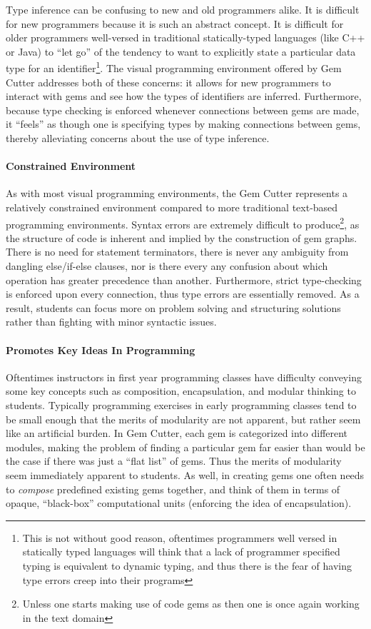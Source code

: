Type inference can be confusing to new and old programmers alike.  It is difficult for new programmers because it is such an abstract concept.  It is difficult for older programmers well-versed in traditional statically-typed languages (like C++ or Java) to ``let go'' of the tendency to want to explicitly state a particular data type for an identifier\footnote{This is not without good reason, oftentimes programmers well versed in statically typed languages will think that a lack of programmer specified typing is equivalent to dynamic typing, and thus there is the fear of having type errors creep into their programs}.  The visual programming environment offered by Gem Cutter addresses both of these concerns: it allows for new programmers to interact with gems and see how the types of identifiers are inferred.  Furthermore, because type checking is enforced whenever connections between gems are made, it ``feels'' as though one is specifying types by making connections between gems, thereby alleviating concerns about the use of type inference.

\paragraph{Constrained Environment}

As with most visual programming environments, the Gem Cutter represents a relatively constrained environment compared to more traditional text-based programming environments.  Syntax errors are extremely difficult to produce\footnote{Unless one starts making use of code gems as then one is once again working in the text domain}, as the structure of code is inherent and implied by the construction of gem graphs.  There is no need for statement terminators, there is never any ambiguity from dangling else/if-else clauses, nor is there every any confusion about which operation has greater precedence than another.  Furthermore, strict type-checking is enforced upon every connection, thus type errors are essentially removed.  As a result, students can focus more on problem solving and structuring solutions rather than fighting with minor syntactic issues.

\paragraph{Promotes Key Ideas In Programming}

Oftentimes instructors in first year programming classes have difficulty conveying some key concepts such as composition, encapsulation, and modular thinking to students.  Typically programming exercises in early programming classes tend to be small enough that the merits of modularity are not apparent, but rather seem like an artificial burden.  In Gem Cutter, each gem is categorized into different modules, making the problem of finding a particular gem far easier than would be the case if there was just a ``flat list'' of gems.  Thus the merits of modularity seem immediately apparent to students.  As well, in creating gems one often needs to \emph{compose} predefined existing gems together, and think of them in terms of opaque, ``black-box'' computational units (enforcing the idea of encapsulation).


